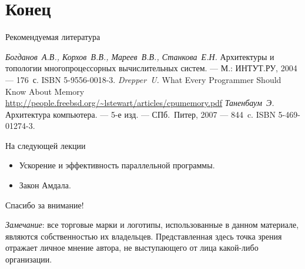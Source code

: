 \section*{Конец}

\begin{frame}[allowframebreaks]{Рекомендуемая литература}
\begin{thebibliography}{99}
    \bibitem{} \textit{Богданов~А.В., Корхов~В.В., Мареев~В.В., Станкова~Е.Н.}
    Архитектуры и топологии многопроцессорных вычислительных систем. --- М.:
    ИНТУТ.РУ, 2004 --- 176~с. ISBN 5-9556-0018-3.
    \bibitem{} \textit{Drepper~U.} What Every Programmer Should Know About Memory
    \url{http://people.freebsd.org/~lstewart/articles/cpumemory.pdf}
    \bibitem{} \textit{Таненбаум~Э.} Архитектура компьютера. --- 5-е изд. ---
        СПб.~Питер, 2007 --- 844~c. ISBN 5-469-01274-3.
\end{thebibliography}
\end{frame}

\begin{frame}{На следующей лекции}
\begin{itemize}
    \item Ускорение и эффективность параллельной программы.
    \item Закон Амдала.
\end{itemize}
\end{frame}

\begin{frame}

{\huge{Спасибо за внимание!}\par}

\vfill

\tiny{\textit{Замечание}: все торговые марки и логотипы, использованные в данном материале, являются собственностью их владельцев. Представленная здесь точка зрения отражает личное мнение автора, не выступающего от лица какой-либо организации.}

\end{frame}


